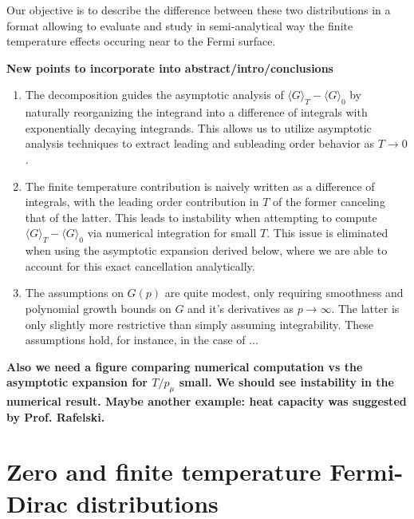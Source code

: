 \documentclass[sn-mathphys,Numbered]{sn-jnl}
\begin{document}
Our objective is to describe the difference between these two distributions in a format allowing to evaluate and study in semi-analytical way the finite temperature effects occuring near to the Fermi surface.

{\bf New points to incorporate into abstract/intro/conclusions}
\begin{enumerate}
\item The decomposition guides the asymptotic analysis of $\langle G\rangle_T-\langle G\rangle_0$ by naturally reorganizing the integrand into a difference of integrals with exponentially decaying integrands. This allows us to utilize asymptotic analysis techniques to   extract  leading and subleading order behavior as $T\to 0$. 
\item The finite temperature contribution is naively written as a difference of integrals, with the leading order contribution in $T$ of the former canceling that of the latter.  This leads to instability when attempting to compute $\langle G\rangle_T-\langle G\rangle_0$ via numerical integration for small $T$.  This issue is eliminated when using the asymptotic expansion derived below, where we are able to account for this exact cancellation analytically. 
\item The assumptions on $G(p)$ are quite modest, only requiring smoothness and polynomial growth bounds on $G$ and it's derivatives as $p\to \infty$.  The latter is only slightly more restrictive than simply assuming integrability.  These assumptions hold, for instance, in the case of ...
\end{enumerate}
{\bf Also we need a figure comparing numerical computation vs the asymptotic expansion for $T/p_\mu$ small.  We should see instability in the numerical result.  Maybe another example: heat capacity was suggested by Prof. Rafelski.}

\section{Zero and finite temperature Fermi-Dirac distributions}
\label{NewFermi}
\end{document}
